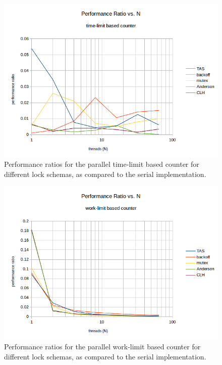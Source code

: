 \documentclass{article}
\newcommand{\cpart}[1]{\newblock{\LARGE {\\\\#1}}}
\begin{document}
\cpart{Lock Scaling}

\begin{figure}
\begin{center}
	\includegraphics[scale=.8]{counter_3.png}
	\caption{Performance ratios for the parallel time-limit based counter for different lock schemas, as compared to the serial implementation.}
	\label{counter_3}
\end{center}
\end{figure}

\begin{figure}
\begin{center}
	\includegraphics[scale=.8]{counter_4.png}
	\caption{Performance ratios for the parallel work-limit based counter for different lock schemas, as compared to the serial implementation.}
	\label{counter_4}
\end{center}
\end{figure}
\end{document}
